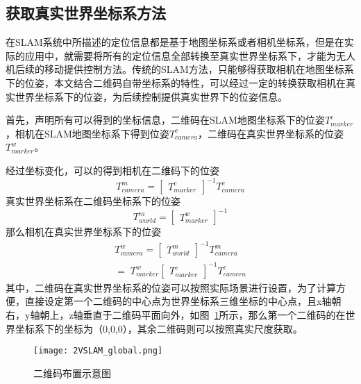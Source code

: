 \subsection{获取真实世界坐标系方法}
\label{sec:2.4.2}
在SLAM系统中所描述的定位信息都是基于地图坐标系或者相机坐标系，但是在实际的应用中，就需要将所有的定位信息全部转换至真实世界坐标系下，才能为无人机后续的移动提供控制方法。传统的SLAM方法，只能够得获取相机在地图坐标系下的位姿，本文结合二维码自带坐标系的特性，可以经过一定的转换获取相机在真实世界坐标系下的位姿，为后续控制提供真实世界下的位姿信息。

首先，声明所有可以得到的坐标信息，二维码在SLAM地图坐标系下的位姿$T_{marker}^{c}$，相机在SLAM地图坐标系下得到位姿$T_{camera}^{c}$，二维码在真实世界坐标系的位姿$T_{marker}^{w}$。

经过坐标变化，可以的得到相机在二维码下的位姿
\begin{equation}
T_{camera}^{m} =\begin{bmatrix}T_{marker}^{c}\end{bmatrix}^{-1}T_{camera}^{c}
\end{equation}
真实世界坐标系在二维码坐标系下的位姿
\begin{equation}
T_{world}^{m} =\begin{bmatrix}T_{marker}^{w}\end{bmatrix}^{-1}
\end{equation}
那么相机在真实世界坐标系下的位姿
\begin{equation}
\begin{array}{l}T_{camera}^w=
\begin{bmatrix}T_{world}^m\end{bmatrix}^{-1}T_{camera}^m\\=\;T_{marker}^w
\begin{bmatrix}T_{marker}^c\end{bmatrix}^{-1}T_{camera}^c\end{array}
\end{equation}
其中，二维码在真实世界坐标系的位姿可以按照实际场景进行设置，为了计算方便，直接设定第一个二维码的中心点为世界坐标系三维坐标的中心点，且x轴朝右，y轴朝上，z轴垂直于二维码平面向外，如图~\ref{fig:2VSLAM_global}所示，那么第一个二维码的在世界坐标系下的坐标为（0,0,0），其余二维码则可以按照真实尺度获取。
\begin{figure}[H] %
  \centering
  \texttt{[image: 2VSLAM\_global.png]}
  \caption{二维码布置示意图}
  \label{fig:2VSLAM_global}
\end{figure}

